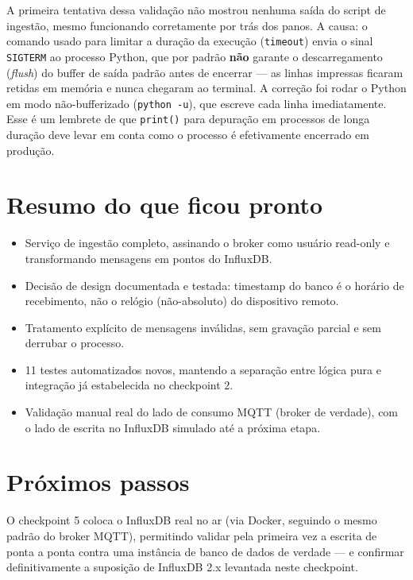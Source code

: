 \documentclass[11pt,a4paper]{article}
\begin{document}
A primeira tentativa dessa validação não mostrou nenhuma saída do script de ingestão, mesmo funcionando corretamente por trás dos panos. A causa: o comando usado para limitar a duração da execução (\texttt{timeout}) envia o sinal \texttt{SIGTERM} ao processo Python, que por padrão \textbf{não} garante o descarregamento (\textit{flush}) do buffer de saída padrão antes de encerrar --- as linhas impressas ficaram retidas em memória e nunca chegaram ao terminal. A correção foi rodar o Python em modo não-bufferizado (\texttt{python -u}), que escreve cada linha imediatamente. Esse é um lembrete de que \texttt{print()} para depuração em processos de longa duração deve levar em conta como o processo é efetivamente encerrado em produção.

\section{Resumo do que ficou pronto}

\begin{itemize}
    \item Serviço de ingestão completo, assinando o broker como usuário read-only e transformando mensagens em pontos do InfluxDB.
    \item Decisão de design documentada e testada: timestamp do banco é o horário de recebimento, não o relógio (não-absoluto) do dispositivo remoto.
    \item Tratamento explícito de mensagens inválidas, sem gravação parcial e sem derrubar o processo.
    \item 11 testes automatizados novos, mantendo a separação entre lógica pura e integração já estabelecida no checkpoint 2.
    \item Validação manual real do lado de consumo MQTT (broker de verdade), com o lado de escrita no InfluxDB simulado até a próxima etapa.
\end{itemize}

\section{Próximos passos}

O checkpoint 5 coloca o InfluxDB real no ar (via Docker, seguindo o mesmo padrão do broker MQTT), permitindo validar pela primeira vez a escrita de ponta a ponta contra uma instância de banco de dados de verdade --- e confirmar definitivamente a suposição de InfluxDB 2.x levantada neste checkpoint.
\end{document}
